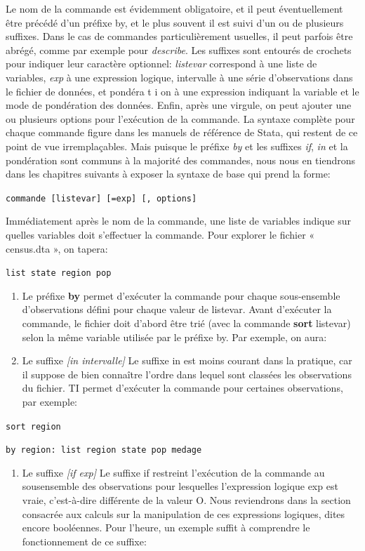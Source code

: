 \documentclass[
]{book}
\providecommand{\tightlist}{%
  \setlength{\itemsep}{0pt}\setlength{\parskip}{0pt}}
\begin{document}
Le nom de la commande est évidemment obligatoire, et il peut
éventuellement être précédé d'un préfixe by, et le plus souvent il
est suivi d'un ou de plusieurs suffixes. Dans le cas de
commandes particulièrement usuelles, il peut parfois être abrégé,
comme par exemple pour \emph{describe}. Les suffixes sont entourés de crochets pour indiquer leur caractère optionnel:
\emph{listevar} correspond à une liste de variables, \emph{exp} à une
expression logique, intervalle à une série d'observations
dans le fichier de données, et pondéra t i on à une expression
indiquant la variable et le mode de pondération des données.
Enfin, après une virgule, on peut ajouter une ou plusieurs
options pour l'exécution de la commande.
La syntaxe complète pour chaque commande figure dans les
manuels de référence de Stata, qui restent de ce point de vue
irremplaçables. Mais puisque le préfixe \emph{by} et les suffixes \emph{if}, \emph{in}
et la pondération sont communs à la majorité des commandes,
nous nous en tiendrons dans les chapitres suivants à exposer la
syntaxe de base qui prend la forme:

\texttt{commande\ {[}listevar{]}\ {[}=exp{]}\ {[},\ options{]}}

Immédiatement après le nom de la commande, une liste de
variables indique sur quelles variables doit s'effectuer la commande. Pour explorer le fichier « census.dta », on tapera:

\texttt{list\ state\ region\ pop}

\begin{enumerate}
\def\labelenumi{(\alph{enumi})}
\item
  Le préfixe \textbf{by}
  permet d'exécuter la commande pour chaque
  sous-ensemble d'observations défini pour chaque valeur de
  listevar. Avant d'exécuter la commande, le fichier doit
  d'abord être trié (avec la commande \textbf{sort} listevar) selon la
  même variable utilisée par le préfixe by. Par exemple, on aura:
\item
  Le suffixe \emph{{[}in intervalle{]}}
  Le suffixe in est moins courant dans la pratique, car il suppose
  de bien connaître l'ordre dans lequel sont classées les
  observations du fichier. TI permet d'exécuter la commande pour
  certaines observations, par exemple:
\end{enumerate}

\texttt{sort\ region}

\texttt{by\ region:\ list\ region\ state\ pop\ medage}

\begin{enumerate}
\def\labelenumi{(\alph{enumi})}
\setcounter{enumi}{1}
\tightlist
\item
  Le suffixe \emph{{[}if exp{]}}
  Le suffixe if restreint l'exécution de la commande au sousensemble
  des observations pour lesquelles l'expression logique
  exp est vraie, c'est-à-dire différente de la valeur O.
  Nous reviendrons dans la section consacrée aux calculs sur la
  manipulation de ces expressions logiques, dites encore
  booléennes. Pour l'heure, un exemple suffit à comprendre le
  fonctionnement de ce suffixe:
\end{enumerate}
\end{document}
